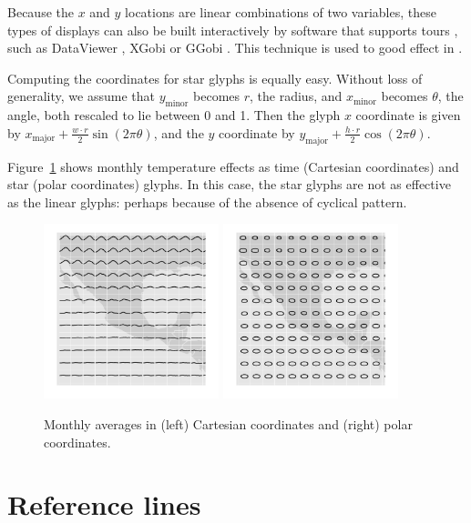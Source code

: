 \documentclass[oneside]{article}
\newcommand\amin{\text{minor}}
\newcommand\amaj{\text{major}}
\begin{document}
Because the $x$ and $y$ locations are linear combinations of two variables, these types of displays can also be built interactively by software that supports tours \citep{cook:2006}, such as DataViewer \citep{buja:1986}, XGobi \citep{swayne:1991} or GGobi \citep{swayne:2003}.  This technique is used to good effect in \citet{buja:1996a}.

Computing the coordinates for star glyphs is equally easy. Without loss of generality, we assume that $y_{\amin}$ becomes $r$, the radius, and $x_{\amin}$ becomes $\theta$, the angle, both rescaled to lie between 0 and 1. Then the glyph $x$ coordinate is given by $x_{\amaj} + \frac{w \cdot r}{2} \sin(2 \pi \theta)$, and the $y$ coordinate by $y_{\amaj} + \frac{h \cdot r}{2} \cos(2 \pi \theta)$. 

Figure~\ref{fig:cycle} shows monthly temperature effects as time (Cartesian coordinates) and star (polar coordinates) glyphs. In this case, the star glyphs are not as effective as the linear glyphs: perhaps because of the absence of cyclical pattern.

\begin{figure}[htbp]
  \centering
  \includegraphics[width=2in]{month-cartesian}
  \includegraphics[width=2in]{month-polar}
    
  \caption{Monthly averages in (left) Cartesian coordinates and (right) polar coordinates.}
  
  \label{fig:cycle}
\end{figure}

\section{Reference lines}
\end{document}
